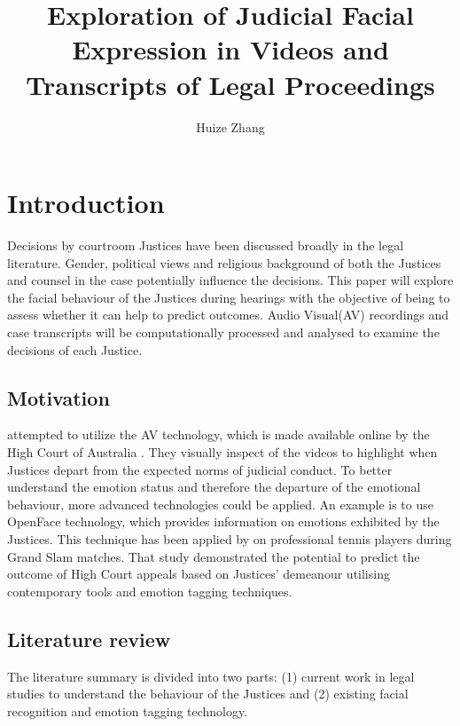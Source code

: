 \documentclass{monashthesis}
\author{Huize Zhang}
\title{Exploration of Judicial Facial Expression in Videos and Transcripts of Legal Proceedings}
\begin{document}

\titlepage

{\sf\tighttoc\doublespacing}

\clearpage{}\setcounter{page}{0}

\hypertarget{ch:intro}{%
\chapter{Introduction}\label{ch:intro}}

Decisions by courtroom Justices have been discussed broadly in the legal literature. Gender, political views and religious background of both the Justices and counsel in the case potentially influence the decisions. This paper will explore the facial behaviour of the Justices during hearings with the objective of being to assess whether it can help to predict outcomes. Audio Visual(AV) recordings and case transcripts will be computationally processed and analysed to examine the decisions of each Justice.

\hypertarget{motivation}{%
\section{Motivation}\label{motivation}}

\textcite{tutton2018judicial} attempted to utilize the AV technology, which is made available online by the High Court of Australia \autocite{highcourtau}. They visually inspect of the videos to highlight when Justices depart from the expected norms of judicial conduct. To better understand the emotion status and therefore the departure of the emotional behaviour, more advanced technologies could be applied. An example is to use OpenFace \autocite*{baltrusaitis2018openface} technology, which provides information on emotions exhibited by the Justices. This technique has been applied by \textcite{kovalchik2018going} on professional tennis players during Grand Slam matches. That study demonstrated the potential to predict the outcome of High Court appeals based on Justices' demeanour utilising contemporary tools and emotion tagging techniques.

\hypertarget{literature-review}{%
\section{Literature review}\label{literature-review}}

The literature summary is divided into two parts: (1) current work in legal studies to understand the behaviour of the Justices and (2) existing facial recognition and emotion tagging technology.
\end{document}

